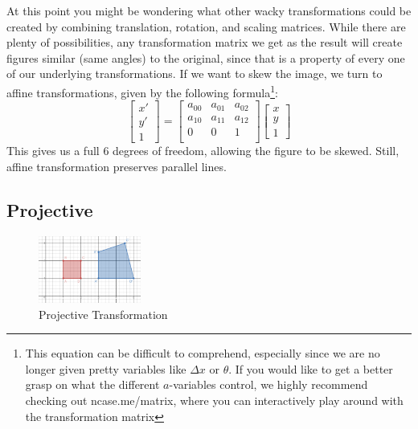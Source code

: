 \documentclass{article}
\begin{document}
At this point you might be wondering what other wacky transformations could be created by combining translation, rotation, and scaling matrices. While there are plenty of possibilities, any transformation matrix we get as the result will create figures similar (same angles) to the original, since that is a property of every one of our underlying transformations. If we want to skew the image, we turn to affine transformations, given by the following formula\footnote{This equation can be difficult to comprehend, especially since we are no longer given pretty variables like $\Delta x$ or $\theta$. If you would like to get a better grasp on what the different $a$-variables control, we highly recommend checking out ncase.me/matrix, where you can interactively play around with the transformation matrix}:
\[
\begin{bmatrix}
x' \\
y' \\
1
\end{bmatrix}
=
\begin{bmatrix}
a_{00} & a_{01} & a_{02} \\
a_{10} & a_{11} & a_{12} \\
0 & 0 & 1 \\
\end{bmatrix}
\begin{bmatrix}
x \\
y \\
1
\end{bmatrix}
\]
\noindent
This gives us a full 6 degrees of freedom, allowing the figure to be skewed. Still, affine transformation preserves parallel lines.

\subsection{Projective}
\begin{figure}
  \begin{center}
    \vspace{-40pt}
    \includegraphics[width=0.30\textwidth]{2d_projective.png}
    \vspace{-20pt}
  \end{center}
  \caption{Projective Transformation}
\end{figure}
\end{document}
